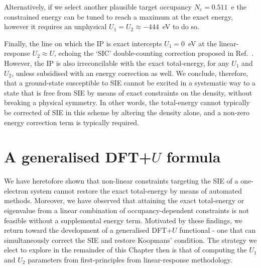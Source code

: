 Alternatively, 
if we select another plausible target occupancy  
$N_\textrm{c} = 0.511$~e 
the constrained energy can be tuned 
to reach a maximum at the exact energy, 
however it requires an unphysical 
$U_1= U_2 \approx -444$~eV 
to do so.

Finally, 
the line on which the IP is exact  
intercepts $U_1 = 0$~eV 
at the linear-response $U_2 \approx U$, 
echoing the `SIC' double-counting 
correction proposed in Ref.~\cite{PhysRevB.76.033102}.
%
However, 
the IP is also irreconcilable with the exact total-energy, 
for any $U_1$ and $U_2$, 
unless subsidised with an energy correction as well.
%
We conclude, therefore, 
that a ground-state susceptible to SIE 
cannot be excited in a systematic way 
to a state that is free from SIE 
by means of exact constraints 
on the density, 
without breaking a physical symmetry.
% 
In other words, 
the total-energy cannot typically be corrected of SIE 
in this scheme by altering the density alone, 
and a non-zero energy correction term is typically required.

\section{A generalised DFT+{$U$} formula}
\label{sec:generalised_dft+u}

We have heretofore shown that 
non-linear constraints 
targeting the SIE of a one-electron system 
cannot restore the exact total-energy 
by means of automated methods.
%
Moreover, 
we have observed that attaining 
the exact total-energy or eigenvalue 
from a linear combination of 
occupancy-dependent  constraints 
is not feasible without 
a supplemental energy term.
%
Motivated by these findings,  
we return toward the development 
of a generalised DFT+$U$ functional - 
one that can simultaneously correct 
the SIE and restore Koopmans' condition. 
%
{The strategy we elect to explore 
in the remainder of this Chapter then  
is that of computing the $U_1$ and $U_2$ parameters 
from first-principles from  linear-response methodology.}

%

